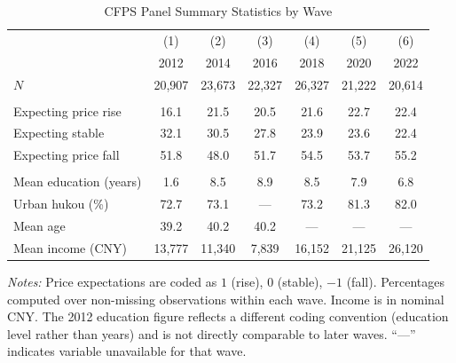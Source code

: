 \begin{table}[htbp]
\centering
\small
\caption{CFPS Panel Summary Statistics by Wave}
\label{tab:cfps_summary}
\begin{threeparttable}

\begin{tabular}{lcccccc}
\toprule
 & (1) & (2) & (3) & (4) & (5) & (6) \\
 & 2012 & 2014 & 2016 & 2018 & 2020 & 2022 \\
\midrule
$N$ & 20,907 & 23,673 & 22,327 & 26,327 & 21,222 & 20,614 \\
\addlinespace
\multicolumn{7}{l}{\textit{Price expectations (\%)}} \\
\addlinespace
\quad Expecting price rise & 16.1 & 21.5 & 20.5 & 21.6 & 22.7 & 22.4 \\
\quad Expecting stable & 32.1 & 30.5 & 27.8 & 23.9 & 23.6 & 22.4 \\
\quad Expecting price fall & 51.8 & 48.0 & 51.7 & 54.5 & 53.7 & 55.2 \\
\addlinespace
\multicolumn{7}{l}{\textit{Demographics}} \\
\addlinespace
\quad Mean education (years) & 1.6 & 8.5 & 8.9 & 8.5 & 7.9 & 6.8 \\
\quad Urban hukou (\%) & 72.7 & 73.1 & --- & 73.2 & 81.3 & 82.0 \\
\quad Mean age & 39.2 & 40.2 & 40.2 & --- & --- & --- \\
\quad Mean income (CNY) & 13,777 & 11,340 & 7,839 & 16,152 & 21,125 & 26,120 \\
\bottomrule
\end{tabular}
\begin{tablenotes}[flushleft]
\footnotesize
\item \textit{Notes:} Price expectations are coded as $1$ (rise), $0$ (stable), $-1$ (fall). Percentages computed over non-missing observations within each wave. Income is in nominal CNY. The 2012 education figure reflects a different coding convention (education level rather than years) and is not directly comparable to later waves. ``---'' indicates variable unavailable for that wave.
\end{tablenotes}
\end{threeparttable}
\end{table}

